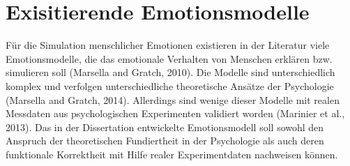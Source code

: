 \chapter{Exisitierende Emotionsmodelle}

Für die Simulation menschlicher Emotionen existieren in der Literatur viele Emotionsmodelle, die das
emotionale Verhalten von Menschen erklären bzw. simulieren soll (Marsella and Gratch, 2010). Die
Modelle sind unterschiedlich komplex und verfolgen unterschiedliche theoretische Ansätze der
Psychologie (Marsella and Gratch, 2014). Allerdings sind wenige dieser Modelle mit realen Messdaten
aus psychologischen Experimenten validiert worden (Marinier et al., 2013). Das in der Dissertation
entwickelte Emotionsmodell soll sowohl den Anspruch der theoretischen Fundiertheit in der
Psychologie als auch deren funktionale Korrektheit mit Hilfe realer Experimentdaten nachweisen
können.